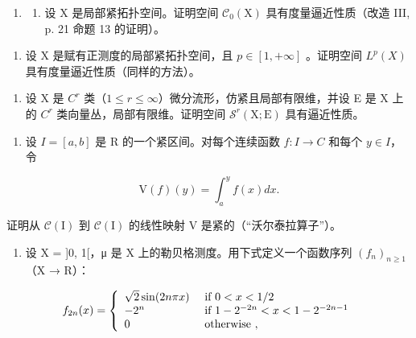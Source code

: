 \begin{enumerate}
\def\labelenumi{\arabic{enumi})}
\setcounter{enumi}{35}
\tightlist
\item
  \begin{enumerate}
  \def\labelenumii{\alph{enumii})}
  \tightlist
  \item
    设 X 是局部紧拓扑空间。证明空间 \(\mathcal{C}_{0}(\mathrm{X})\) 具有度量逼近性质（改造 III, p. 21 命题 13 的证明）。
  \end{enumerate}
\end{enumerate}

\begin{enumerate}
\def\labelenumi{\alph{enumi})}
\setcounter{enumi}{1}
\tightlist
\item
  设 X 是赋有正测度的局部紧拓扑空间，且 \(p \in [1, +\infty]\) 。证明空间 \(L^{p}(X)\) 具有度量逼近性质（同样的方法）。
\end{enumerate}

\begin{enumerate}
\def\labelenumi{\arabic{enumi})}
\setcounter{enumi}{36}
\tightlist
\item
  设 X 是 \(C^{r}\) 类（\(1 \leqslant r \leqslant \infty\)）微分流形，仿紧且局部有限维，并设 E 是 X 上的 \(C^{r}\) 类向量丛，局部有限维。证明空间 \(\mathcal{S}^{r}(\mathrm{X};\mathrm{E})\) 具有逼近性质。
\end{enumerate}

\exercisesection{}

\begin{enumerate}
\def\labelenumi{\arabic{enumi})}
\tightlist
\item
  设 \(I = [a, b]\) 是 R 的一个紧区间。对每个连续函数 \(f: I \to C\) 和每个 \(y \in I\)，令
\end{enumerate}

\[
\mathrm{V} (f) (y) = \int_ {a} ^ {y} f (x) d x.
\]

证明从 \(\mathcal{C}(\mathrm{I})\) 到 \(\mathcal{C}(\mathrm{I})\) 的线性映射 V 是紧的（“沃尔泰拉算子”）。

\begin{enumerate}
\def\labelenumi{\arabic{enumi})}
\setcounter{enumi}{1}
\tightlist
\item
  设 X = {]}0, 1{[}，μ 是 X 上的勒贝格测度。用下式定义一个函数序列 \((f_{n})_{n \geqslant 1}\)（X → R）：
\end{enumerate}

\[
f _ {2 n} (x) = \left\{ \begin{array}{l l} \sqrt {2} \sin (2 n \pi x) & \text { if } 0 <   x <   1 / 2 \\ - 2 ^ {n} & \text { if } 1 - 2 ^ {- 2 n} <   x <   1 - 2 ^ {- 2 n - 1} \\ 0 & \text { otherwise }, \end{array} \right.
\]

